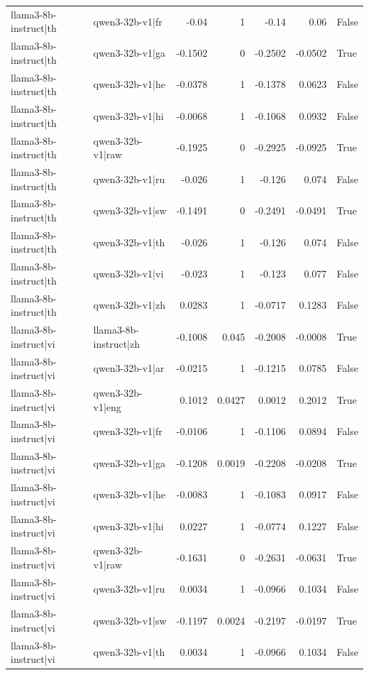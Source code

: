 \begin{table}
\begin{tabular}{l l r r r r l}
llama3-8b-instruct|th & qwen3-32b-v1|fr & -0.04 & 1 & -0.14 & 0.06 & False \\
llama3-8b-instruct|th & qwen3-32b-v1|ga & -0.1502 & 0 & -0.2502 & -0.0502 & True \\
llama3-8b-instruct|th & qwen3-32b-v1|he & -0.0378 & 1 & -0.1378 & 0.0623 & False \\
llama3-8b-instruct|th & qwen3-32b-v1|hi & -0.0068 & 1 & -0.1068 & 0.0932 & False \\
llama3-8b-instruct|th & qwen3-32b-v1|raw & -0.1925 & 0 & -0.2925 & -0.0925 & True \\
llama3-8b-instruct|th & qwen3-32b-v1|ru & -0.026 & 1 & -0.126 & 0.074 & False \\
llama3-8b-instruct|th & qwen3-32b-v1|sw & -0.1491 & 0 & -0.2491 & -0.0491 & True \\
llama3-8b-instruct|th & qwen3-32b-v1|th & -0.026 & 1 & -0.126 & 0.074 & False \\
llama3-8b-instruct|th & qwen3-32b-v1|vi & -0.023 & 1 & -0.123 & 0.077 & False \\
llama3-8b-instruct|th & qwen3-32b-v1|zh & 0.0283 & 1 & -0.0717 & 0.1283 & False \\
llama3-8b-instruct|vi & llama3-8b-instruct|zh & -0.1008 & 0.045 & -0.2008 & -0.0008 & True \\
llama3-8b-instruct|vi & qwen3-32b-v1|ar & -0.0215 & 1 & -0.1215 & 0.0785 & False \\
llama3-8b-instruct|vi & qwen3-32b-v1|eng & 0.1012 & 0.0427 & 0.0012 & 0.2012 & True \\
llama3-8b-instruct|vi & qwen3-32b-v1|fr & -0.0106 & 1 & -0.1106 & 0.0894 & False \\
llama3-8b-instruct|vi & qwen3-32b-v1|ga & -0.1208 & 0.0019 & -0.2208 & -0.0208 & True \\
llama3-8b-instruct|vi & qwen3-32b-v1|he & -0.0083 & 1 & -0.1083 & 0.0917 & False \\
llama3-8b-instruct|vi & qwen3-32b-v1|hi & 0.0227 & 1 & -0.0774 & 0.1227 & False \\
llama3-8b-instruct|vi & qwen3-32b-v1|raw & -0.1631 & 0 & -0.2631 & -0.0631 & True \\
llama3-8b-instruct|vi & qwen3-32b-v1|ru & 0.0034 & 1 & -0.0966 & 0.1034 & False \\
llama3-8b-instruct|vi & qwen3-32b-v1|sw & -0.1197 & 0.0024 & -0.2197 & -0.0197 & True \\
llama3-8b-instruct|vi & qwen3-32b-v1|th & 0.0034 & 1 & -0.0966 & 0.1034 & False \\

\end{tabular}
\end{table}
